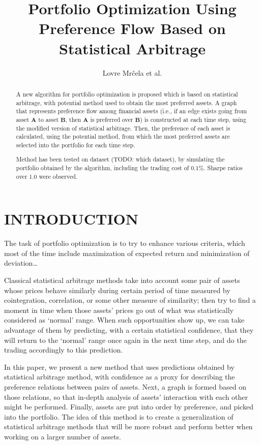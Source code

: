 \documentclass[letterpaper, 10 pt, conference]{ieeeconf}
\title{\LARGE \bf Portfolio Optimization Using Preference Flow Based on Statistical Arbitrage}
\author{Lovre Mr\v{c}ela et al.}
\begin{document}
  \maketitle
  \thispagestyle{empty}
  \pagestyle{empty}
    
  \begin{abstract}
    
  A new algorithm for portfolio optimization is proposed which is based on statistical arbitrage, with potential method used to obtain the most preferred assets.
  A graph that represents preference flow among financial assets (i.e., if an edge exists going from asset $\mathbold{A}$ to asset $\mathbold{B}$, then $\mathbold{A}$ is preferred over $\mathbold{B}$) is constructed at each time step, using the modified version of statistical arbitrage.
  Then, the preference of each asset is calculated, using the potential method\cite{caklovic}, from which the most preferred assets are selected into the portfolio for each time step.
  
  Method has been tested on dataset (TODO: which dataset), by simulating the portfolio obtained by the algorithm, including the trading cost of 0.1\%.
  Sharpe ratios over 1.0 were observed.
  
  \end{abstract}
  
  \section{INTRODUCTION}
  
  The task of portfolio optimization is to try to enhance various criteria, which most of the time include maximization of expected return and minimization of deviation\dots
  
  Classical statistical arbitrage methods take into account some pair of assets whose prices behave similarly during certain period of time measured by cointegration, correlation, or some other measure of similarity; then try to find a moment in time when those assets' prices go out of what was statistically considered as `normal' range.
  When such opportunities show up, we can take advantage of them by predicting, with a certain statistical confidence, that they will return to the `normal' range once again in the next time step, and do the trading accordingly to this prediction.
  
  In this paper, we present a new method that uses predictions obtained by statistical arbitrage method, with confidence as a proxy for describing the preference relations between pairs of assets.
  Next, a graph is formed based on those relations, so that in-depth analysis of assets' interaction with each other might be performed.
  Finally, assets are put into order by preference, and picked into the portfolio.
  The idea of this method is to create a generalization of statistical arbitrage methods that will be more robust and perform better when working on a larger number of assets.
  
\end{document}
